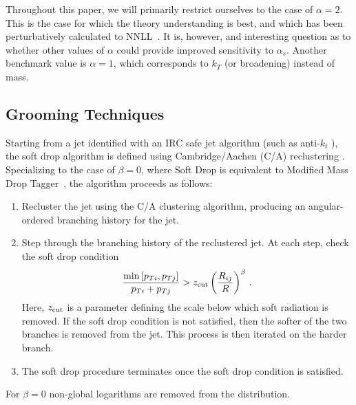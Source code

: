 Throughout this paper, we will primarily restrict ourselves to the
case of $\alpha=2$. This is the case for which the theory
understanding is best, and which has been perturbatively calculated to
NNLL~\cite{Frye:2016okc,Frye:2016aiz}.  It is, however, and interesting
question as to whether other values of $\alpha$ could provide improved
sensitivity to $\alpha_s$. Another benchmark value is $\alpha=1$,
which corresponds to $k_T$ (or broadening) instead of mass.


\subsection{Grooming Techniques}\label{sec:groom_tech}

Starting from a jet identified with an IRC safe jet algorithm (such as
anti-$k_t$ \cite{Cacciari:2008gp}), the soft drop algorithm is defined
using Cambridge/Aachen (C/A) reclustering
\cite{Dokshitzer:1997in,Wobisch:1998wt,Wobisch:2000dk}.  Specializing
to the case of $\beta=0$, where Soft Drop is equivalent to Modified
Mass Drop Tagger~\cite{Dasgupta:2013ihk}, the algorithm proceeds as
follows: 
\begin{enumerate}

\item Recluster the jet using the C/A clustering algorithm, producing an angular-ordered branching history for the jet.

\item Step through the branching history of the reclustered jet.  At each step, check the soft drop condition
\begin{align}\label{eq:sd_cut}
\frac{\min\left[ p_{Ti}, p_{Tj}  \right]}{p_{Ti}+p_{Tj}}> z_{\rm cut} \left(   \frac{R_{ij}}{R}\right)^\beta \,.
\end{align}
Here, $z_{\rm cut}$ is a parameter defining the scale below which soft radiation is removed.  If the soft drop condition is not satisfied, then the softer of the two branches is removed from the jet.  This process is then iterated on the harder branch.

\item The soft drop procedure terminates once the soft drop condition is satisfied.

\end{enumerate}

For $\beta=0$ non-global logarithms are removed from the distribution.  




